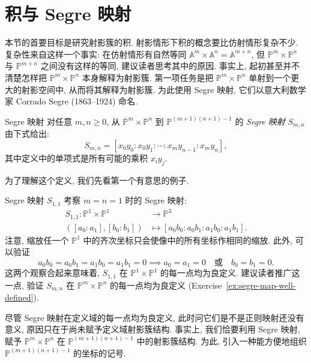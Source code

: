 \section{积与 Segre 映射}\label{sec:products-and-segre-maps}

本节的首要目标是研究射影簇的积. 射影情形下积的概念要比仿射情形复杂不少. 复杂性来自这样一个事实: 在仿射情形有自然等同 $\mathbb{A}^{m}\times\mathbb{A}^{n}=\mathbb{A}^{m+n}$, 但 $\mathbb{P}^{m}\times\mathbb{P}^{n}$ 与 $\mathbb{P}^{m+n}$ 之间没有这样的等同, 建议读者思考其中的原因. 事实上, 起初甚至并不清楚怎样把 $\mathbb{P}^{m}\times\mathbb{P}^{n}$ 本身解释为射影簇. 第一项任务是把 $\mathbb{P}^{m}\times\mathbb{P}^{n}$ 单射到一个更大的射影空间中, 从而将其解释为射影簇. 为此使用 Segre 映射, 它们以意大利数学家 Corrado Segre (1863--1924) 命名.

\begin{Definition}{Segre 映射}\leavevmode\label{def:segre-map}
对任意 $m,n\ge0$, 从 $\mathbb{P}^{m}\times\mathbb{P}^{n}$ 到 $\mathbb{P}^{(m+1)(n+1)-1}$ 的 \emph{Segre 映射} $S_{m,n}$ 由下式给出:
\[
  S_{m,n}=[x_{0}y_{0}:x_{0}y_{1}:\cdots:x_{m}y_{n-1}:x_{m}y_{n}],
\]
其中定义中的单项式是所有可能的乘积 $x_{i}y_{j}$.
\end{Definition}

为了理解这个定义, 我们先看第一个有意思的例子.

\begin{Example}{Segre 映射 $S_{1,1}$}\leavevmode\label{ex:segre-product-of-two-projective-lines}
考察 $m=n=1$ 时的 Segre 映射:
\[
  \begin{aligned}
    S_{1,1}:\mathbb{P}^{1}\times\mathbb{P}^{1}&\to\mathbb{P}^{3}\\
    ([a_{0}:a_{1}],[b_{0}:b_{1}])&\mapsto[a_{0}b_{0}:a_{0}b_{1}:a_{1}b_{0}:a_{1}b_{1}].
  \end{aligned}
\]
注意, 缩放任一个 $\mathbb{P}^{1}$ 中的齐次坐标只会使像中的所有坐标作相同的缩放. 此外, 可以验证
\[
  a_{0}b_{0}=a_{0}b_{1}=a_{1}b_{0}=a_{1}b_{1}=0
  \implies a_{0}=a_{1}=0\quad\text{或}\quad b_{0}=b_{1}=0.
\]
这两个观察合起来意味着, $S_{1,1}$ 在 $\mathbb{P}^{1}\times\mathbb{P}^{1}$ 的每一点均为良定义. 建议读者推广这一点, 验证 $S_{m,n}$ 在 $\mathbb{P}^{m}\times\mathbb{P}^{n}$ 的每一点均为良定义 (Exercise~\ref{ex:segre-map-well-defined}).
\end{Example}

尽管 Segre 映射在定义域的每一点均为良定义, 此时问它们是不是正则映射还没有意义, 原因只在于尚未赋予定义域射影簇结构. 事实上, 我们恰要利用 Segre 映射, 赋予 $\mathbb{P}^{m}\times\mathbb{P}^{n}$ 在 $\mathbb{P}^{(m+1)(n+1)-1}$ 中的射影簇结构. 为此, 引入一种能方便地组织 $\mathbb{P}^{(m+1)(n+1)-1}$ 的坐标的记号.

